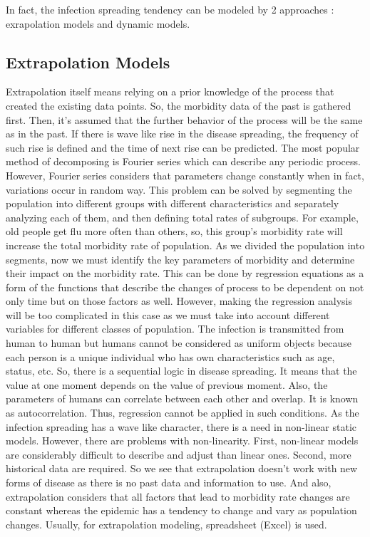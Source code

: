 In fact, the infection spreading tendency can be modeled by 2 approaches \cite{per13}: exrapolation models and dynamic models.


\subsection{Extrapolation Models}

Extrapolation itself means relying on a prior knowledge of the process that created the existing data points. So, the morbidity data of the past is gathered first. Then, it’s assumed that the further behavior of the process will be the same as in the past. If there is wave like rise in the disease spreading, the frequency of such rise is defined and the time of next rise can be predicted. The most popular method of decomposing is Fourier series which can describe any periodic process. However, Fourier series considers that parameters change constantly when in fact, variations occur in random way. This problem can be solved by segmenting the population into different groups with different characteristics and separately analyzing each of them, and then defining total rates of subgroups. For example, old people get flu more often than others, so, this group’s morbidity rate will increase the total morbidity rate of population. As we divided the population into segments, now we must identify the key parameters of morbidity and determine their impact on the morbidity rate. This can be done by regression equations as a form of the functions that describe the changes of process to be dependent on not only time but on those factors as well. However, making the regression analysis will be too complicated in this case as we must take into account different variables for different classes of population. The infection is transmitted from human to human but humans cannot be considered as uniform objects because each person is a unique individual who has own characteristics such as age, status, etc. So, there is a sequential logic in disease spreading. It means that the value at one moment depends on the value of previous moment. Also, the parameters of humans can correlate between each other and overlap. It is known as autocorrelation. Thus, regression cannot be applied in such conditions.  As the infection spreading has a wave like character, there is a need in non-linear static models.  However, there are problems with non-linearity. First, non-linear models are considerably difficult to describe and adjust than linear ones. Second, more historical data are required.
So we see that extrapolation doesn’t work with new forms of disease as there is no past data and information to use. And also, extrapolation considers that all factors that lead to morbidity rate changes are constant whereas the epidemic has a tendency to change and vary as population changes. Usually, for extrapolation modeling, spreadsheet (Excel) is used.


